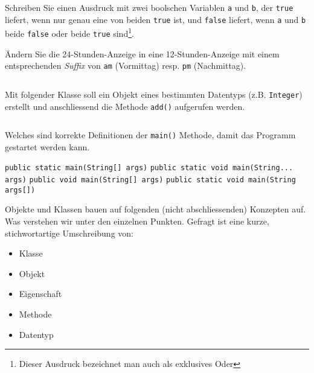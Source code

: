 \documentclass[12pt,a4paper]{exam}
\begin{document}
\begin{questions}
        \newpage
        \question[5] Schreiben Sie einen Ausdruck mit zwei boolschen Variablen \texttt{a}
        und \texttt{b}, der \texttt{true} liefert, wenn nur genau eine von beiden \texttt{true}
        ist, und \texttt{false} liefert, wenn \texttt{a} und \texttt{b} beide \texttt{false}
        oder beide \texttt{true} sind\footnote{Dieser Ausdruck bezeichnet man auch als
        exklusives Oder}.

        \makeemptybox{5cm}
        \addpoints

        \question[10] Ändern Sie die 24-Stunden-Anzeige in eine 12-Stunden-Anzeige
        mit einem entsprechenden \emph{Suffix} von \texttt{am} (Vormittag) resp.
        \texttt{pm} (Nachmittag).

        \inputminted[autogobble,firstline=74,lastline=77]
            {java}{../java/time/Display.java}
        \makeemptybox{10cm}
        \addpoints

        \newpage
        \question[10]
        Mit folgender Klasse soll ein Objekt eines bestimmten Datentyps (z.B.
        \texttt{Integer}) erstellt und anschliessend die Methode
        \texttt{add()} aufgerufen werden.
        \inputminted[autogobble,linenos,firstline=3]{java}{../java/generics/Cache.java}
        \makeemptybox{2in}

        {%
        \checkboxchar{$\Box$} %
        \question[4] Welches sind korrekte Definitionen der \texttt{main()} Methode,
        damit das Programm gestartet werden kann.
        \addpoints
        \begin{checkboxes}
            \choice \texttt{public static main(String[] args)}
            \choice \texttt{public static void main(String... args)}
            \choice \texttt{public void main(String[] args)}
            \choice \texttt{public static void main(String args[])}
        \end{checkboxes}
        }%

        \newpage
        \question[10]
        Objekte und Klassen bauen auf folgenden (nicht abschliessenden) Konzepten auf.
        Was verstehen wir unter den einzelnen Punkten. Gefragt ist eine kurze, stichwortartige
        Umschreibung von:
        \begin{itemize}
            \item Klasse
            \item Objekt
            \item Eigenschaft
            \item Methode
            \item Datentyp
        \end{itemize}
        \makeemptybox{\fill}


\end{questions}
\end{document}
